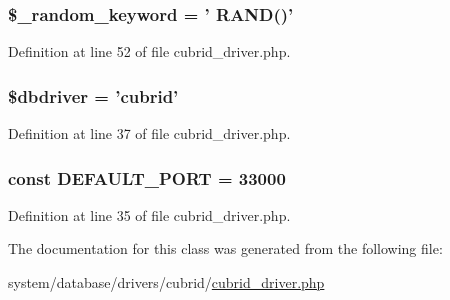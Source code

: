 \hypertarget{class_c_i___d_b__cubrid__driver_a10213aa6e05f6d924d3277bb1d2fea00}{
\subsubsection[{\$\-\_\-random\-\_\-keyword}]{\setlength{\rightskip}{0pt plus 5cm}\$\-\_\-random\-\_\-keyword = ' R\-A\-N\-D()'}}\label{class_c_i___d_b__cubrid__driver_a10213aa6e05f6d924d3277bb1d2fea00}


Definition at line 52 of file cubrid\-\_\-driver.\-php.

\hypertarget{class_c_i___d_b__cubrid__driver_a0cde2a16322a023d040aa7f725877597}{
\subsubsection[{\$dbdriver}]{\setlength{\rightskip}{0pt plus 5cm}\$dbdriver = 'cubrid'}}\label{class_c_i___d_b__cubrid__driver_a0cde2a16322a023d040aa7f725877597}


Definition at line 37 of file cubrid\-\_\-driver.\-php.

\hypertarget{class_c_i___d_b__cubrid__driver_adbbe510a37f177c138ebb598c3fdb161}{
\subsubsection[{D\-E\-F\-A\-U\-L\-T\-\_\-\-P\-O\-R\-T}]{\setlength{\rightskip}{0pt plus 5cm}const D\-E\-F\-A\-U\-L\-T\-\_\-\-P\-O\-R\-T = 33000}}\label{class_c_i___d_b__cubrid__driver_adbbe510a37f177c138ebb598c3fdb161}


Definition at line 35 of file cubrid\-\_\-driver.\-php.



The documentation for this class was generated from the following file\-:\begin{DoxyCompactItemize}
\item 
system/database/drivers/cubrid/\hyperlink{cubrid__driver_8php}{cubrid\-\_\-driver.\-php}\end{DoxyCompactItemize}

